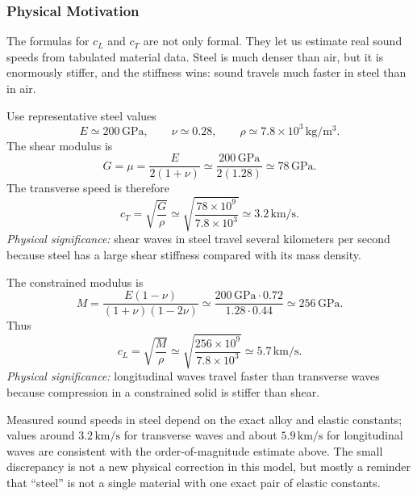 \documentclass[../main.tex]{subfiles}
\begin{document}
\subsubsection*{Physical Motivation}
The formulas for $c_L$ and $c_T$ are not only formal. They let us estimate real sound speeds from tabulated material data. Steel is much denser than air, but it is enormously stiffer, and the stiffness wins: sound travels much faster in steel than in air.

Use representative steel values
\begin{equation}
    E\simeq 200\,\mathrm{GPa},
    \qquad
    \nu\simeq0.28,
    \qquad
    \rho\simeq7.8\times10^3\,\mathrm{kg/m^3}.
    \label{eq:lec07_steel_data}
\end{equation}
The shear modulus is
\begin{equation}
    G=\mu=\frac{E}{2(1+\nu)}
    \simeq
    \frac{200\,\mathrm{GPa}}{2(1.28)}
    \simeq 78\,\mathrm{GPa}.
    \label{eq:lec07_steel_shear_modulus}
\end{equation}
The transverse speed is therefore
\begin{equation}
    \boxed{
    c_T=\sqrt{\frac{G}{\rho}}
    \simeq
    \sqrt{\frac{78\times10^9}{7.8\times10^3}}
    \simeq3.2\,\mathrm{km/s}.}
    \label{eq:lec07_steel_transverse_speed}
\end{equation}
\textit{Physical significance:} shear waves in steel travel several kilometers per second because steel has a large shear stiffness compared with its mass density.

The constrained modulus is
\begin{equation}
    M=\frac{E(1-\nu)}{(1+\nu)(1-2\nu)}
    \simeq
    \frac{200\,\mathrm{GPa}\cdot0.72}{1.28\cdot0.44}
    \simeq256\,\mathrm{GPa}.
    \label{eq:lec07_steel_constrained_modulus}
\end{equation}
Thus
\begin{equation}
    \boxed{
    c_L=\sqrt{\frac{M}{\rho}}
    \simeq
    \sqrt{\frac{256\times10^9}{7.8\times10^3}}
    \simeq5.7\,\mathrm{km/s}.}
    \label{eq:lec07_steel_longitudinal_speed}
\end{equation}
\textit{Physical significance:} longitudinal waves travel faster than transverse waves because compression in a constrained solid is stiffer than shear.

Measured sound speeds in steel depend on the exact alloy and elastic constants; values around $3.2\,\mathrm{km/s}$ for transverse waves and about $5.9\,\mathrm{km/s}$ for longitudinal waves are consistent with the order-of-magnitude estimate above. The small discrepancy is not a new physical correction in this model, but mostly a reminder that ``steel'' is not a single material with one exact pair of elastic constants.
\end{document}
